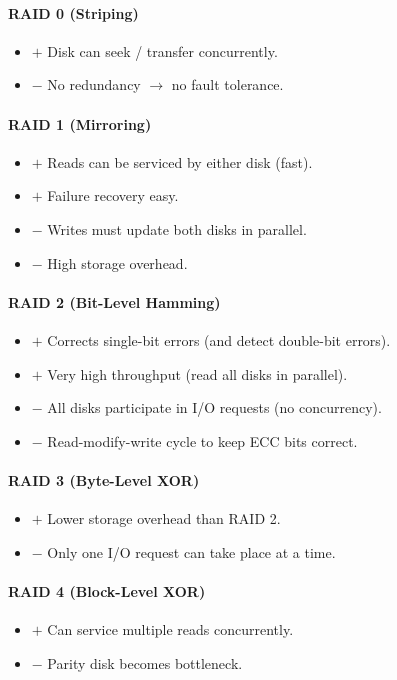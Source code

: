 \documentclass[twocolumn,english]{article}
\begin{document}
\paragraph{RAID 0 (Striping)}
\begin{itemize}
\item $+$ Disk can seek / transfer concurrently.
\item $-$ No redundancy $\rightarrow$ no fault tolerance.
\end{itemize}

\paragraph{RAID 1 (Mirroring)}
\begin{itemize}
\item $+$ Reads can be serviced by either disk (fast).
\item $+$ Failure recovery easy.
\item $-$ Writes must update both disks in parallel.
\item $-$ High storage overhead.
\end{itemize}

\paragraph{RAID 2 (Bit-Level Hamming)}
\begin{itemize}
\item $+$ Corrects single-bit errors (and detect double-bit errors).
\item $+$ Very high throughput (read all disks in parallel).
\item $-$ All disks participate in I/O requests (no concurrency).
\item $-$ Read-modify-write cycle to keep ECC bits correct.
\end{itemize}

\paragraph{RAID 3 (Byte-Level XOR)}
\begin{itemize}
\item $+$ Lower storage overhead than RAID 2.
\item $-$ Only one I/O request can take place at a time.
\end{itemize}

\paragraph{RAID 4 (Block-Level XOR)}
\begin{itemize}
\item $+$ Can service multiple reads concurrently.
\item $-$ Parity disk becomes bottleneck.
\end{itemize}
\end{document}
